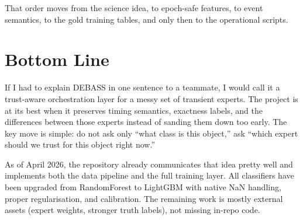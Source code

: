 \documentclass[11pt]{article}
\begin{document}
That order moves from the science idea, to epoch-safe features, to event semantics, to the gold training tables, and only then to the operational scripts.

\section{Bottom Line}

If I had to explain DEBASS in one sentence to a teammate, I would call it a trust-aware orchestration layer for a messy set of transient experts. The project is at its best when it preserves timing semantics, exactness labels, and the differences between those experts instead of sanding them down too early. The key move is simple: do not ask only ``what class is this object,'' ask ``which expert should we trust for this object right now.''

As of April 2026, the repository already communicates that idea pretty well and implements both the data pipeline and the full training layer. All classifiers have been upgraded from RandomForest to LightGBM with native NaN handling, proper regularisation, and calibration. The remaining work is mostly external assets (expert weights, stronger truth labels), not missing in-repo code.
\end{document}
